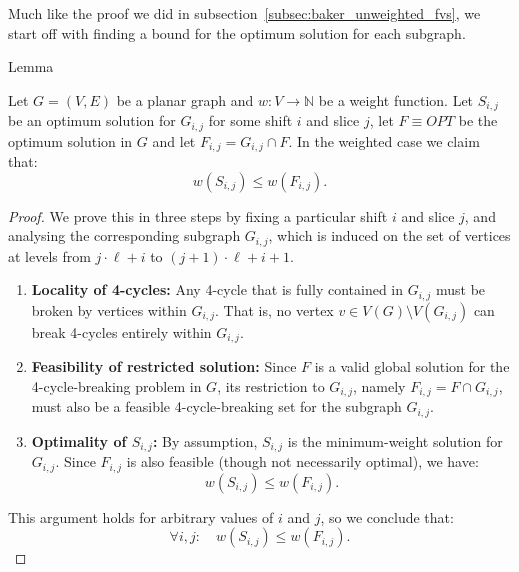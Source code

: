 Much like the proof we did in subsection~\ref{subsec:baker_unweighted_fvs}, we start off with 
finding a bound for the optimum solution for each subgraph. 

\begin{mydefinition}{Lemma}
    \label{lemma-osbwc}

    Let $G = (V, E)$ be a planar graph and $w : V \rightarrow \mathbb{N}$ be a weight function.
    Let $S_{i, j}$ be an optimum solution for $G_{i, j}$ for some shift $i$ and slice $j$, 
    let $F \equiv OPT$ be the optimum solution in $G$ and let $F_{i, j} = G_{i, j} \cap F$. 
    In the weighted case we claim that: \[w(S_{i, j}) \leq w(F_{i, j})\text{.}\]

\end{mydefinition}

\begin{proof}
    
    We prove this in three steps by fixing a particular shift $i$ and slice $j$, 
    and analysing the corresponding subgraph $G_{i, j}$, which is induced on the set of vertices 
    at levels from $j \cdot \ell + i$ to $(j + 1) \cdot \ell + i + 1$.
    
    \begin{enumerate}
        \item \textbf{Locality of 4-cycles:}  
        Any 4-cycle that is fully contained in $G_{i, j}$ must be broken by vertices within $G_{i, j}$.  
        That is, no vertex \( v \in V(G) \setminus V(G_{i, j}) \) can break 4-cycles entirely within \( G_{i, j} \).
    
        \item \textbf{Feasibility of restricted solution:}  
        Since $F$ is a valid global solution for the 4-cycle-breaking problem in $G$,  
        its restriction to $G_{i, j}$, namely \( F_{i, j} = F \cap G_{i, j} \),  
        must also be a feasible 4-cycle-breaking set for the subgraph $G_{i, j}$.
    
        \item \textbf{Optimality of $S_{i, j}$:}  
        By assumption, $S_{i, j}$ is the minimum-weight solution for $G_{i, j}$.  
        Since $F_{i, j}$ is also feasible (though not necessarily optimal), we have:
        \[
        w(S_{i, j}) \leq w(F_{i, j})\text{.}
        \]
    \end{enumerate}
    
    This argument holds for arbitrary values of \( i \) and \( j \), so we conclude that:
    \[
    \forall i, j: \quad w(S_{i, j}) \leq w(F_{i, j})\text{.}
    \]
    
\end{proof}

